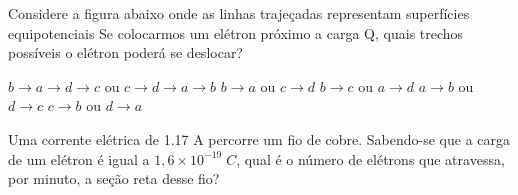 \documentclass[12pt, addpoints]{exam}
\begin{document}
    \begin{questions}
\begin{multicols*}{2}
\question Considere a figura abaixo onde as linhas trajeçadas representam superfícies equipotenciais Se colocarmos um elétron próximo a carga Q, quais trechos possíveis o elétron poderá se deslocar?
        
        \begin{center}
            \begin{minipage}[c]{0.5\linewidth}
            \end{minipage}
        \end{center}
        
        

\begin{choices}
\choice $b\rightarrow a\rightarrow d\rightarrow c$ ou $c\rightarrow d\rightarrow a\rightarrow b$ 
\choice $b\rightarrow a$ ou $c\rightarrow d$ 
\choice $b\rightarrow c$ ou $a\rightarrow d$ 
\choice $a\rightarrow b$ ou $d\rightarrow c$ 
\choice $c\rightarrow b$ ou $d\rightarrow a$ 
\end{choices}
\question Uma corrente elétrica de    1.17 A percorre um ﬁo de cobre. Sabendo-se que a carga de um elétron é igual a $1,6\times 10^{-19}\;C$, qual é o número de elétrons que atravessa, por minuto, a seção reta desse ﬁo?


\end{multicols*}
\end{questions}
\end{document}
